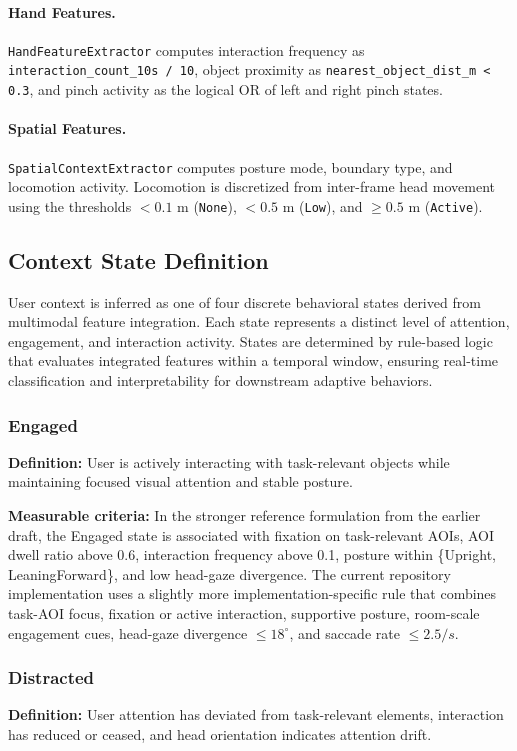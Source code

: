\documentclass[10pt,twocolumn]{article}
\begin{document}
\paragraph{Hand Features.}
\texttt{HandFeatureExtractor} computes interaction frequency as \texttt{interaction\_count\_10s / 10}, object proximity as \texttt{nearest\_object\_dist\_m < 0.3}, and pinch activity as the logical OR of left and right pinch states.

\paragraph{Spatial Features.}
\texttt{SpatialContextExtractor} computes posture mode, boundary type, and locomotion activity. Locomotion is discretized from inter-frame head movement using the thresholds \(< 0.1\) m (\texttt{None}), \(< 0.5\) m (\texttt{Low}), and \(\geq 0.5\) m (\texttt{Active}).

\subsection{Context State Definition}
User context is inferred as one of four discrete behavioral states derived from multimodal feature integration. Each state represents a distinct level of attention, engagement, and interaction activity. States are determined by rule-based logic that evaluates integrated features within a temporal window, ensuring real-time classification and interpretability for downstream adaptive behaviors.

\subsubsection{Engaged}
\textbf{Definition:} User is actively interacting with task-relevant objects while maintaining focused visual attention and stable posture.

\textbf{Measurable criteria:} In the stronger reference formulation from the earlier draft, the Engaged state is associated with fixation on task-relevant AOIs, AOI dwell ratio above 0.6, interaction frequency above 0.1, posture within \{Upright, LeaningForward\}, and low head-gaze divergence. The current repository implementation uses a slightly more implementation-specific rule that combines task-AOI focus, fixation or active interaction, supportive posture, room-scale engagement cues, head-gaze divergence \(\leq 18^\circ\), and saccade rate \(\leq 2.5/s\).

\subsubsection{Distracted}
\textbf{Definition:} User attention has deviated from task-relevant elements, interaction has reduced or ceased, and head orientation indicates attention drift.
\end{document}

